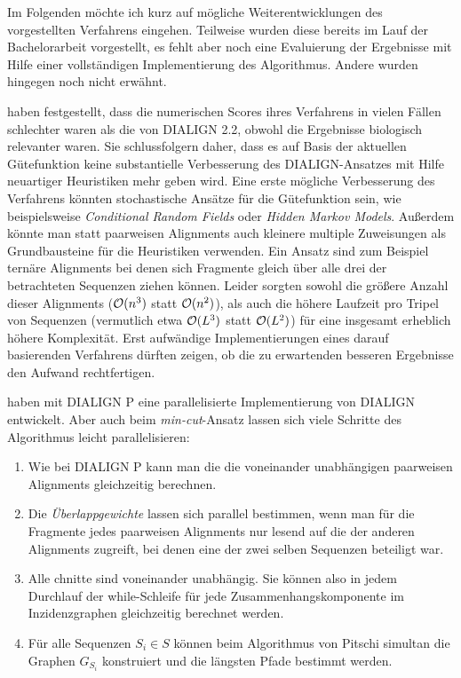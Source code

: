 Im Folgenden möchte ich kurz auf mögliche Weiterentwicklungen des vorgestellten Verfahrens eingehen. Teilweise wurden diese bereits im Lauf der Bachelorarbeit vorgestellt, es fehlt aber noch eine Evaluierung der Ergebnisse mit Hilfe einer vollständigen Implementierung des Algorithmus. Andere wurden hingegen noch nicht erwähnt.

\cite{cpm10} haben festgestellt, dass die numerischen Scores ihres Verfahrens in vielen Fällen schlechter waren als die von DIALIGN 2.2, obwohl die Ergebnisse biologisch relevanter waren. Sie schlussfolgern daher, dass es auf Basis der aktuellen Gütefunktion keine substantielle Verbesserung des DIALIGN-Ansatzes mit Hilfe neuartiger Heuristiken mehr geben wird. Eine erste mögliche Verbesserung des Verfahrens könnten stochastische Ansätze für die Gütefunktion sein, wie beispielsweise \emph{Conditional Random Fields} oder \emph{Hidden Markov Models}. Außerdem könnte man statt paarweisen Alignments auch kleinere multiple Zuweisungen als Grundbausteine für die Heuristiken verwenden. Ein Ansatz sind zum Beispiel ternäre Alignments bei denen sich Fragmente gleich über alle drei der betrachteten Sequenzen ziehen können. Leider sorgten sowohl die größere Anzahl dieser Alignments ($\mathcal{O}(n^3)$ statt $\mathcal{O}(n^2)$), als auch die höhere Laufzeit pro Tripel von Sequenzen (vermutlich etwa $\mathcal{O}(L^3)$ statt $\mathcal{O}(L^2)$) für eine insgesamt erheblich höhere Komplexität. Erst aufwändige Implementierungen eines darauf basierenden Verfahrens dürften zeigen, ob die zu erwartenden besseren Ergebnisse den Aufwand rechtfertigen.

\cite{snkm04} haben mit DIALIGN P eine parallelisierte Implementierung von DIALIGN entwickelt. Aber auch beim \emph{min-cut}-Ansatz lassen sich viele Schritte des Algorithmus leicht parallelisieren:

\begin{enumerate}[topsep=0pt,itemsep=-1ex,partopsep=1ex,parsep=1ex]
	\item Wie bei DIALIGN P kann man die die voneinander unabhängigen paarweisen Alignments gleichzeitig berechnen.
	\item Die \emph{Überlappgewichte} lassen sich parallel bestimmen, wenn man für die Fragmente jedes paarweisen Alignments nur lesend auf die der anderen Alignments zugreift, bei denen eine der zwei selben Sequenzen beteiligt war.
	\item Alle chnitte sind voneinander unabhängig. Sie können also in jedem Durchlauf der while-Schleife für jede Zusammenhangskomponente im Inzidenzgraphen gleichzeitig berechnet werden.
	\item Für alle Sequenzen $S_i \in S$ können beim Algorithmus von Pitschi simultan die Graphen $G_{S_i}$ konstruiert und die längsten Pfade bestimmt werden.
\end{enumerate}

